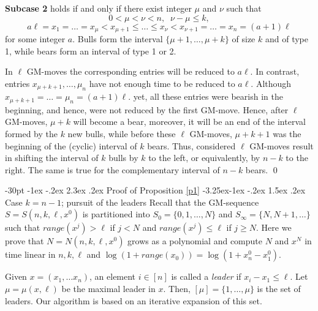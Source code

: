 \documentclass[10pt]{article}
\makeatletter
\renewcommand\section{\@startsection {section}{1}{\z@}
{-30pt \@plus -1ex \@minus -.2ex}
{2.3ex \@plus.2ex}
{\normalfont\normalsize\bfseries\boldmath}}
\renewcommand\subsection{\@startsection{subsection}{2}{\z@}
{-3.25ex\@plus -1ex \@minus -.2ex}
{1.5ex \@plus .2ex}
{\normalfont\normalsize\bfseries\boldmath}}
\theoremstyle{definition}
\makeatother
\begin{document}
\bigskip 

{\bf Subcase 2} holds if and only if  
there exist integer $\mu$ and $\nu$  such that  
$$0 < \mu < \nu < n, \;\; \nu - \mu \leq k,$$  
$$a \ell = x_1 = \ldots = x_\mu < 
x_{\mu+1} \leq \ldots \leq x_\nu < 
x_{\nu+1} = \ldots = x_n = (a+1) \ell$$ 
for some integer $a$.  
Bulls form the interval $\{\mu+1, \ldots, \mu+k\}$  
of size  $k$ and of type 1, 
while bears form an interval of type 1 or 2. 

In $\ell$ GM-moves the corresponding entries 
will be reduced to $a \ell$. 
In contrast, entries $x_{\mu+k+1}, \ldots, \mu_n$ 
have not enough time to be reduced to $a \ell$.
Although 
\newline 
$x_{\mu+k+1} = \ldots = \mu_n = (a+1) \ell$. 
yet, all these entries were bearish in the beginning, 
and hence, were not reduced by the first GM-move. 
Hence, after $\ell$ GM-moves, 
$\mu + k$  will become a bear, 
moreover, it will be an end of the 
interval formed by the  $k$ new bulls, 
while before these $\ell$ GM-moves, 
$\mu+k+1$  was the beginning of the 
(cyclic) interval of $k$ bears. 
Thus, considered $\ell$ GM-moves result 
in shifting the interval of $k$ bulls 
by $k$ to the left, 
or equivalently, by  $n-k$ to the right.
The same is true for the complementary 
interval of $n-k$  bears. 
\qed

\section{Proof of Proposition \ref{p1}}
\subsection{Case $k=n-1$; pursuit of the leaders}
\label{ss-pursuit} 
Recall that the  GM-sequence 
$S = S(n,k,\ell,x^0)$  
is partitioned 
into  $S_0 = \{0,1, \ldots, N\}$  and  
$S_\infty = \{N, N+1, \ldots\}$  such that  
$range(x^j) > \ell$  if $j < N$  and 
$range(x^j) \leq \ell$  if $j \geq N$.  
Here we prove that $N = N(n,k,\ell,x^0)$ 
grows as a polynomial and compute $N$ and $x^N$ 
in time linear in  $n,k,\ell$  and 
$\log(1 + range(x_0)) = \log(1 + x^0_n - x^0_1)$. 
   
Given $x = (x_1, \ldots x_n)$,  
an element $i \in [n]$ is called a {\em leader} 
if  $x_i - x_1 \leq \ell$. 
Let $\mu = \mu(x, \ell)$  be the maximal leader in $x$. 
Then, $[\mu] = \{1, \ldots, \mu\}$ is the set of leaders. 
Our algorithm is based on an iterative expansion of this set.
\end{document}
